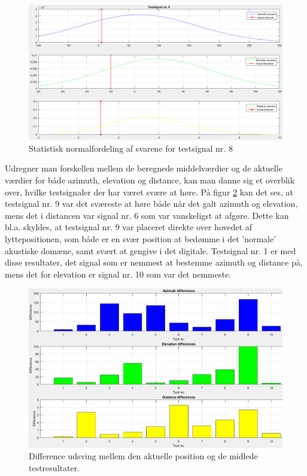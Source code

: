 \begin{figure}[h]
	\centering
	\includegraphics[width=1.1\linewidth]{All_Pics/test8stat}
	\caption{Statistisk normalfordeling af svarene for testsignal nr. 8}
	\label{fig:test8stat}
\end{figure}

Udregner man forskellen mellem de beregnede middelværdier og de aktuelle værdier for både azimuth, elevation og distance, kan man danne sig et overblik over, hvilke testsignaler der har været svære at høre. På figur \ref{fig:resoverblikdiff} kan det ses, at testsignal nr. 9 var det sværeste at høre både når det galt azimuth og elevation, mens det i distancen var signal nr. 6 som var vanskeligst at afgøre. Dette kan bl.a. skyldes, at testsignal nr. 9 var placeret direkte over hovedet af lyttepositionen, som både er en svær position at bedømme i det 'normale' akustiske domæne, samt svært at gengive i det digitale. 
Testsignal nr. 1 er med disse resultater, det signal som er nemmest at bestemme azimuth og distance på, mens det for elevation er signal nr. 10 som var det nemmeste.


\begin{figure}[h]
	\centering
	\includegraphics[width=1\linewidth]{All_Pics/resoverblikdiff}
	\caption{Difference udsving mellem den aktuelle position og de midlede testresultater.}
	\label{fig:resoverblikdiff}
\end{figure}






